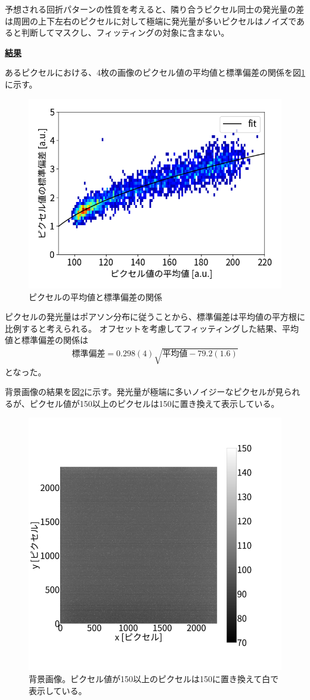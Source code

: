 \documentclass[a4paper,11pt,uplatex]{jsbook}
\begin{document}
予想される回折パターンの性質を考えると、隣り合うピクセル同士の発光量の差は周囲の上下左右のピクセルに対して極端に発光量が多いピクセルはノイズであると判断してマスクし、フィッティングの対象に含まない。

\noindent \textbf{\underline{結果}}\par
あるピクセルにおける、4枚の画像のピクセル値の平均値と標準偏差の関係を図\ref{pixel}に示す。
\begin{figure}[h]
  \centering
  \includegraphics[width=0.8\linewidth]{image/4-pixel.png}
  \caption{ピクセルの平均値と標準偏差の関係}\label{pixel}
\end{figure}

ピクセルの発光量はポアソン分布に従うことから、標準偏差は平均値の平方根に比例すると考えられる。
オフセットを考慮してフィッティングした結果、平均値と標準偏差の関係は
\begin{eqnarray}
  \text{標準偏差} = 0.298(4) \sqrt{\text{平均値} - 79.2(1.6) } 
\end{eqnarray}
となった。

背景画像の結果を図\ref{BG}に示す。発光量が極端に多いノイジーなピクセルが見られるが、ピクセル値が150以上のピクセルは150に置き換えて表示している。
\begin{figure}[h]
  \centering
  \includegraphics[width=0.8\linewidth]{image/4-BG.png}
  \caption{背景画像。ピクセル値が150以上のピクセルは150に置き換えて白で表示している。}\label{BG}
\end{figure}
\end{document}
